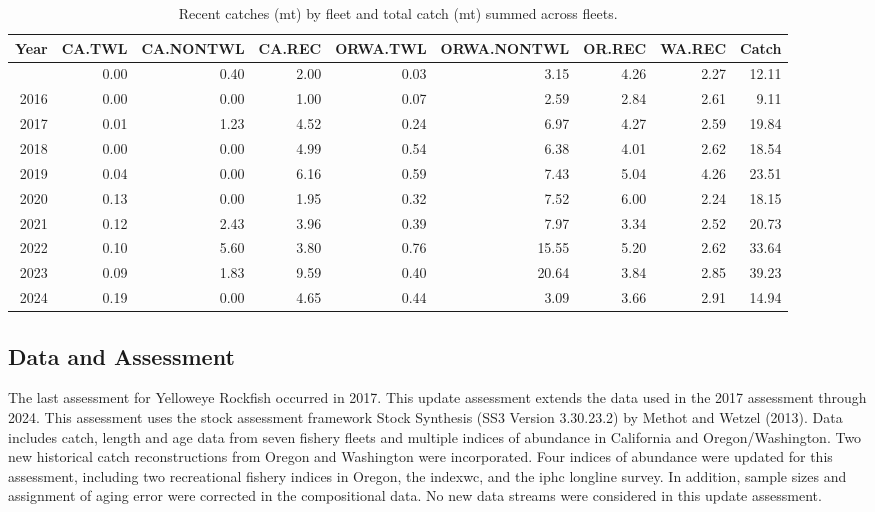 \documentclass[
]{scrartcl}
\begin{document}
\begin{landscape}

\begingroup
\setlength{}
\setlength{}\fontsize{9.0pt}{10.8pt}\selectfont

\begin{longtable}{@{\extracolsep{\fill}}rrrrrrrrr}

\caption{\label{tbl-es-catches}Recent catches (mt) by fleet and total
catch (mt) summed across fleets.}

\tabularnewline

\toprule
Year & CA.TWL & CA.NONTWL & CA.REC & ORWA.TWL & ORWA.NONTWL & OR.REC & WA.REC & Catch \\ 
\midrule\addlinespace[2.5pt]
2015 & 0.00 & 0.40 & 2.00 & 0.03 & 3.15 & 4.26 & 2.27 & 12.11 \\ 
2016 & 0.00 & 0.00 & 1.00 & 0.07 & 2.59 & 2.84 & 2.61 & 9.11 \\ 
2017 & 0.01 & 1.23 & 4.52 & 0.24 & 6.97 & 4.27 & 2.59 & 19.84 \\ 
2018 & 0.00 & 0.00 & 4.99 & 0.54 & 6.38 & 4.01 & 2.62 & 18.54 \\ 
2019 & 0.04 & 0.00 & 6.16 & 0.59 & 7.43 & 5.04 & 4.26 & 23.51 \\ 
2020 & 0.13 & 0.00 & 1.95 & 0.32 & 7.52 & 6.00 & 2.24 & 18.15 \\ 
2021 & 0.12 & 2.43 & 3.96 & 0.39 & 7.97 & 3.34 & 2.52 & 20.73 \\ 
2022 & 0.10 & 5.60 & 3.80 & 0.76 & 15.55 & 5.20 & 2.62 & 33.64 \\ 
2023 & 0.09 & 1.83 & 9.59 & 0.40 & 20.64 & 3.84 & 2.85 & 39.23 \\ 
2024 & 0.19 & 0.00 & 4.65 & 0.44 & 3.09 & 3.66 & 2.91 & 14.94 \\ 
\bottomrule

\end{longtable}

\endgroup

\end{landscape}

\clearpage

\subsection*{Data and Assessment}\label{data-and-assessment}

The last assessment for Yelloweye Rockfish occurred in 2017. This update
assessment extends the data used in the 2017 assessment through 2024.
This assessment uses the stock assessment framework Stock Synthesis (SS3
Version 3.30.23.2) by Methot and Wetzel (2013). Data includes catch,
length and age data from seven fishery fleets and multiple indices of
abundance in California and Oregon/Washington. Two new historical catch
reconstructions from Oregon and Washington were incorporated. Four
indices of abundance were updated for this assessment, including two
recreational fishery indices in Oregon, the \gls{indexwc}, and the
\gls{iphc} longline survey. In addition, sample sizes and assignment of
aging error were corrected in the compositional data. No new data
streams were considered in this update assessment.
\end{document}
